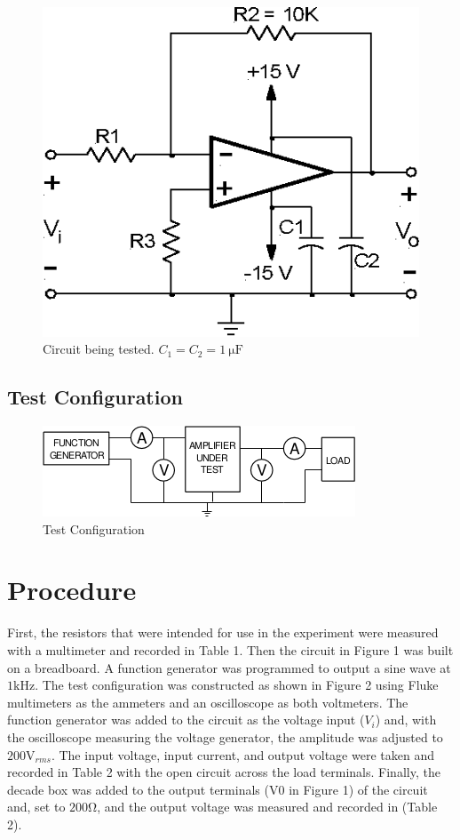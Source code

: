 \documentclass{article}
\begin{document}
\begin{figure}[hbtp]
  \label{fig:circuit}
  \centering
    \includegraphics[]{img/ckt_tested}
  \caption{Circuit being tested.  $C_1 = C_2 = \SI{1}{\micro\farad}$}
\end{figure}

\subsection*{Test Configuration}
\label{sec:test_config}

\begin{figure}[hbtp]
  \centering
  \includegraphics[]{img/test_config}
  \caption{Test Configuration}
  \label{fig:test_config}
\end{figure}

\section{Procedure}
\label{sec:procedure}

First, the resistors that were intended for use in the experiment were
measured with a multimeter and recorded in Table 1.  Then the circuit
in Figure 1 was built on a breadboard.  A function generator was
programmed to output a sine wave at $1\si{\kilo\hertz}$.  The test
configuration was constructed as shown in Figure 2 using Fluke
multimeters as the ammeters and an oscilloscope as both voltmeters.
The function generator was added to the circuit as the voltage input
($V_i$) and, with the oscilloscope measuring the voltage generator,
the amplitude was adjusted to $200\si{\volt_{rms}}$.  The input
voltage, input current, and output voltage were taken and recorded in
Table 2 with the open circuit across the load terminals.  Finally, the
decade box was added to the output terminals (V0 in Figure 1) of the
circuit and, set to $200 \si{\ohm}$, and the output voltage was
measured and recorded in (Table 2).
\end{document}
